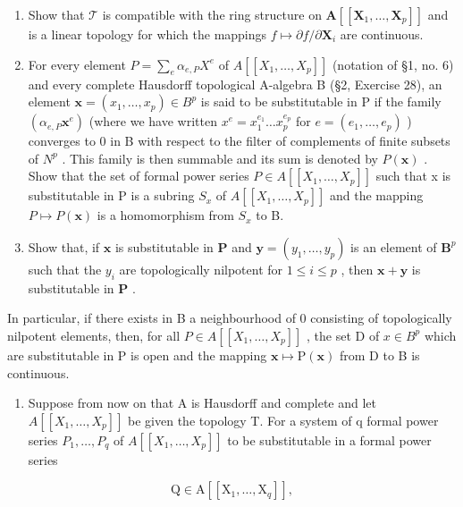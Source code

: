 \begin{enumerate}
\def\labelenumi{(\alph{enumi})}
\item
  Show that \(\mathcal{T}\) is compatible with the ring structure on \(\mathbf{A}[[\mathbf{X}_1,\dots ,\mathbf{X}_p]]\) and is a linear topology for which the mappings \(f\mapsto \partial f / \partial \mathbf{X}_i\) are continuous.
\item
  For every element \(P = \sum_{e} \alpha_{e,P} X^{e}\) of \(A[[X_{1}, \ldots, X_{p}]]\) (notation of §1, no. 6) and every complete Hausdorff topological A-algebra B (§2, Exercise 28), an element \(\mathbf{x} = (x_{1}, \ldots, x_{p}) \in B^{p}\) is said to be substitutable in P if the family \((\alpha_{e,P}\mathbf{x}^{e})\) (where we have written \(x^{e} = x_{1}^{e_{1}} \ldots x_{p}^{e_{p}}\) for \(e = (e_{1}, \ldots, e_{p})\) ) converges to 0 in B with respect to the filter of complements of finite subsets of \(N^{p}\) . This family is then summable and its sum is denoted by \(P(\mathbf{x})\) . Show that the set of formal power series \(P \in A[[X_{1}, \ldots, X_{p}]]\) such that x is substitutable in P is a subring \(S_{x}\) of \(A[[X_{1}, \ldots, X_{p}]]\) and the mapping \(P \mapsto P(\mathbf{x})\) is a homomorphism from \(S_{x}\) to B.
\item
  Show that, if \(\mathbf{x}\) is substitutable in \(\mathbf{P}\) and \(\mathbf{y} = (y_1, \ldots, y_p)\) is an element of \(\mathbf{B}^p\) such that the \(y_i\) are topologically nilpotent for \(1 \leqslant i \leqslant p\) , then \(\mathbf{x} + \mathbf{y}\) is substitutable in \(\mathbf{P}\) .
\end{enumerate}

In particular, if there exists in B a neighbourhood of 0 consisting of topologically nilpotent elements, then, for all \(P \in A[[X_{1}, \ldots, X_{p}]]\) , the set D of \(x \in B^{p}\) which are substitutable in P is open and the mapping \(\mathbf{x} \mapsto \mathrm{P}(\mathbf{x})\) from D to B is continuous.

\begin{enumerate}
\def\labelenumi{(\alph{enumi})}
\setcounter{enumi}{3}
\tightlist
\item
  Suppose from now on that A is Hausdorff and complete and let \(A[[X_{1},\ldots,X_{p}]]\) be given the topology T. For a system of q formal power series \(P_{1},\ldots,P_{q}\) of \(A[[X_{1},\ldots,X_{p}]]\) to be substitutable in a formal power series
\end{enumerate}

\[
\mathrm{Q} \in \mathrm{A} [ [ \mathrm{X} _ {1}, \dots , \mathrm{X} _ {q} ] ],
\]

